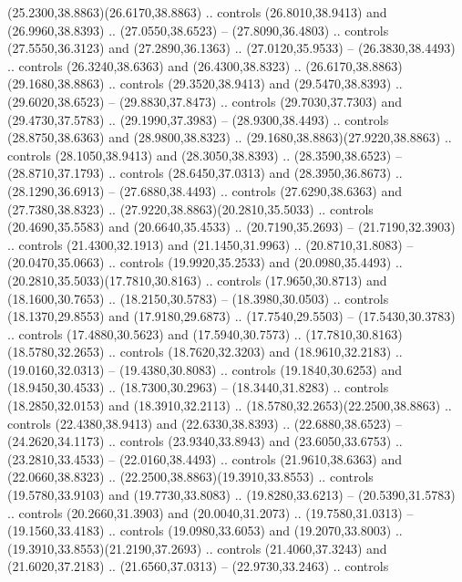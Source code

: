 \begin{scope}[cm={{1.25,0.0,0.0,-1.25,(0.0,59.09163)}}]
        (25.2300,38.8863)(26.6170,38.8863) .. controls (26.8010,38.9413) and
        (26.9960,38.8393) .. (27.0550,38.6523) -- (27.8090,36.4803) .. controls
        (27.5550,36.3123) and (27.2890,36.1363) .. (27.0120,35.9533) --
        (26.3830,38.4493) .. controls (26.3240,38.6363) and (26.4300,38.8323) ..
        (26.6170,38.8863)(29.1680,38.8863) .. controls (29.3520,38.9413) and
        (29.5470,38.8393) .. (29.6020,38.6523) -- (29.8830,37.8473) .. controls
        (29.7030,37.7303) and (29.4730,37.5783) .. (29.1990,37.3983) --
        (28.9300,38.4493) .. controls (28.8750,38.6363) and (28.9800,38.8323) ..
        (29.1680,38.8863)(27.9220,38.8863) .. controls (28.1050,38.9413) and
        (28.3050,38.8393) .. (28.3590,38.6523) -- (28.8710,37.1793) .. controls
        (28.6450,37.0313) and (28.3950,36.8673) .. (28.1290,36.6913) --
        (27.6880,38.4493) .. controls (27.6290,38.6363) and (27.7380,38.8323) ..
        (27.9220,38.8863)(20.2810,35.5033) .. controls (20.4690,35.5583) and
        (20.6640,35.4533) .. (20.7190,35.2693) -- (21.7190,32.3903) .. controls
        (21.4300,32.1913) and (21.1450,31.9963) .. (20.8710,31.8083) --
        (20.0470,35.0663) .. controls (19.9920,35.2533) and (20.0980,35.4493) ..
        (20.2810,35.5033)(17.7810,30.8163) .. controls (17.9650,30.8713) and
        (18.1600,30.7653) .. (18.2150,30.5783) -- (18.3980,30.0503) .. controls
        (18.1370,29.8553) and (17.9180,29.6873) .. (17.7540,29.5503) --
        (17.5430,30.3783) .. controls (17.4880,30.5623) and (17.5940,30.7573) ..
        (17.7810,30.8163)(18.5780,32.2653) .. controls (18.7620,32.3203) and
        (18.9610,32.2183) .. (19.0160,32.0313) -- (19.4380,30.8083) .. controls
        (19.1840,30.6253) and (18.9450,30.4533) .. (18.7300,30.2963) --
        (18.3440,31.8283) .. controls (18.2850,32.0153) and (18.3910,32.2113) ..
        (18.5780,32.2653)(22.2500,38.8863) .. controls (22.4380,38.9413) and
        (22.6330,38.8393) .. (22.6880,38.6523) -- (24.2620,34.1173) .. controls
        (23.9340,33.8943) and (23.6050,33.6753) .. (23.2810,33.4533) --
        (22.0160,38.4493) .. controls (21.9610,38.6363) and (22.0660,38.8323) ..
        (22.2500,38.8863)(19.3910,33.8553) .. controls (19.5780,33.9103) and
        (19.7730,33.8083) .. (19.8280,33.6213) -- (20.5390,31.5783) .. controls
        (20.2660,31.3903) and (20.0040,31.2073) .. (19.7580,31.0313) --
        (19.1560,33.4183) .. controls (19.0980,33.6053) and (19.2070,33.8003) ..
        (19.3910,33.8553)(21.2190,37.2693) .. controls (21.4060,37.3243) and
        (21.6020,37.2183) .. (21.6560,37.0313) -- (22.9730,33.2463) .. controls

\end{scope}

